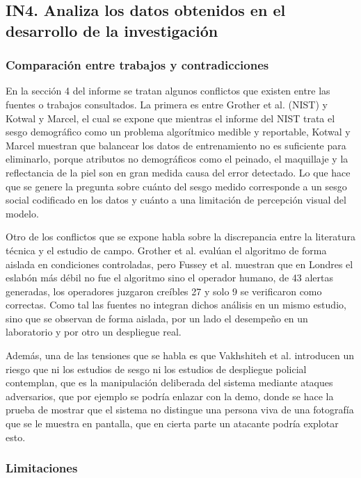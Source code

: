 
\subsection{IN4. Analiza los datos obtenidos en el desarrollo de la investigación}

\subsubsection{Comparación entre trabajos y contradicciones}

En la sección 4 del informe se tratan algunos conflictos que existen entre las fuentes o trabajos consultados. La primera es entre Grother et al. (NIST) y Kotwal y Marcel, el cual se expone que mientras el informe del NIST trata el sesgo demográfico como un problema algorítmico medible y reportable, Kotwal y Marcel muestran que balancear los datos de entrenamiento no es suficiente para eliminarlo, porque atributos no demográficos como el peinado, el maquillaje y la reflectancia de la piel son en gran medida causa del error detectado. Lo que hace que se genere la pregunta sobre cuánto del sesgo medido corresponde a un sesgo social codificado en los datos y cuánto a una limitación de percepción visual del modelo.

Otro de los conflictos que se expone habla sobre la discrepancia entre la literatura técnica y el estudio de campo. Grother et al. evalúan el algoritmo de forma aislada en condiciones controladas, pero Fussey et al. muestran que en Londres el eslabón más débil no fue el algoritmo sino el operador humano, de 43 alertas generadas, los operadores juzgaron creíbles 27 y solo 9 se verificaron como correctas. Como tal las fuentes no integran dichos análisis en un mismo estudio, sino que se observan de forma aislada, por un lado el desempeño en un laboratorio y por otro un despliegue real.

Además, una de las tensiones que se habla es que Vakhshiteh et al. introducen un riesgo que ni los estudios de sesgo ni los estudios de despliegue policial contemplan, que es la manipulación deliberada del sistema mediante ataques adversarios, que por ejemplo se podría enlazar con la demo, donde se hace la prueba de mostrar que el sistema no distingue una persona viva de una fotografía que se le muestra en pantalla, que en cierta parte un atacante podría explotar esto.

\subsubsection{Limitaciones}

